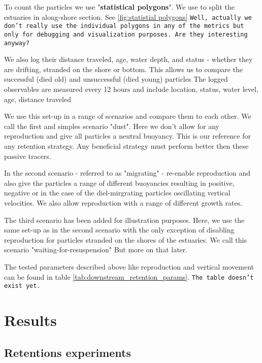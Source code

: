 To count the particles we use "\textbf{statistical polygons}".
We use to split the estuaries in along-shore section. See  \ref{fig:statistial polygons}
\texttt{Well, actually we don't really use the individual polygons in any of the metrics but only for debugging and visualization purposes. Are they interesting anyway?}

We also log their distance traveled, age, water depth, and status - whether they are drifting, stranded on the shore or bottom.
This allows us to compare the successful (died old) and unsuccessful (died young) particles 
The logged observables are measured every 12 hours and include location, status, water level, age, distance traveled  

We use this set-up in a range of scenarios and compare them to each other.
We call the first and simples scenario "dust". Here we don't allow for any reproduction and give all particles a neutral buoyancy.
This is our reference for any retention strategy. Any beneficial strategy must perform better then these passive tracers.

In the second scenario - referred to as "migrating" - re-enable reproduction and also give the particles a range of different buoyancies resulting in positive, negative or in the case of the diel-mirgrating particles oscillating vertical velocities.
We also allow reproduction with a range of different growth rates.

The third scenario has been added for illustration purposes.
Here, we use the same set-up as in the second scenario with the only exception of disabling reproduction for particles stranded on the shores of the estuaries.
We call this scenario "waiting-for-resuspension"
\label{txt:waiting-for-resuspsension}
But more on that later.

The tested parameters described above like reproduction and vertical movement can be found in table \ref{tab:downstream_retention_params}.
\smallskip
\texttt{The table doesn't exist yet.}
\smallskip


\section*{Results}

\subsection*{Retentions experiments}

